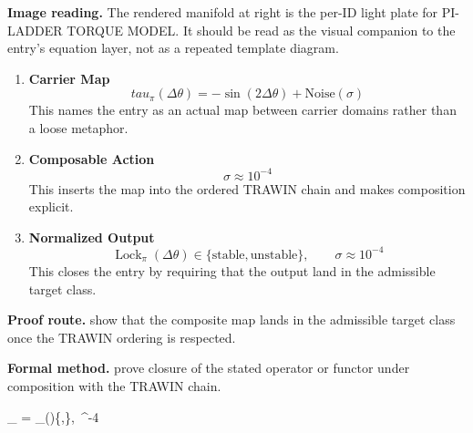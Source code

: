 \begin{samepage}
\noindent\begin{minipage}[t]{0.45\linewidth}
\vspace{0pt}
\raggedright
\scriptsize\textbf{Image reading.} The rendered manifold at right is the per-ID light plate for PI-LADDER TORQUE MODEL. It should be read as the visual companion to the entry's equation layer, not as a repeated template diagram.\par
\end{minipage}\hfill
\begin{minipage}[t]{0.53\linewidth}
\vspace*{-0.10in}
\raggedright
{}
\end{minipage}
\end{samepage}

\clearpage


\begin{enumerate}[leftmargin=1.6em,itemsep=9pt,topsep=6pt]
\item \textbf{Carrier Map}
\[
tau_{\pi}(\Delta \theta) = -\sin(2\Delta \theta) + \text{Noise}(\sigma)
\]
This names the entry as an actual map between carrier domains rather than a loose metaphor.

\item \textbf{Composable Action}
\[
\sigma \approx 10^{-4}
\]
This inserts the map into the ordered TRAWIN chain and makes composition explicit.

\item \textbf{Normalized Output}
\[
\operatorname{Lock}_{\pi}(\Delta\theta)\in\{\mathrm{stable},\mathrm{unstable}\},
\qquad
\sigma \approx 10^{-4}
\]
This closes the entry by requiring that the output land in the admissible target class.
\end{enumerate}

\textbf{Proof route.} show that the composite map lands in the admissible target class once the TRAWIN ordering is respected.

\textbf{Formal method.} prove closure of the stated operator or functor under composition with the TRAWIN chain.

\medskip
{}

\begin{tzpsnapshot}
\end{tzpsnapshot}

\tzpequationlinks
  { \to {}}
  {_{} = \cdots}
  {_{\pi}(\Delta\theta)\in\{,\},\ \sigma{}^{-4}}

